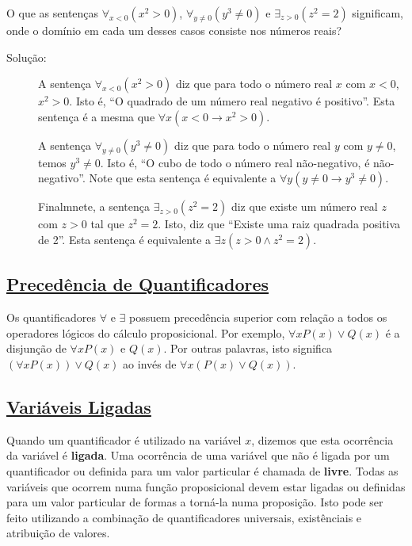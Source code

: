 \begin{exmp}
\label{exem141}
O que as sentenças $\forall_{x<0}(x^2 > 0)$, $\forall_{y \neq 0}(y^3 \neq 0)$ e
$\exists_{z>0}(z^2 = 2)$ significam, onde o domínio em cada um desses casos
consiste nos números reais?
\begin{description}
\item[Solução:] A sentença $\forall_{x<0}(x^2 > 0)$ diz que para todo o
número real $x$ com $x<0$, $x^2>0$. Isto é, ``O quadrado de um número real
negativo é positivo''. Esta sentença é a mesma que $\forall x(x<0 \to x^2>0)$.

A sentença $\forall_{y \neq 0}(y^3 \neq 0)$ diz que para todo o número real
$y$ com $y\neq0$, temos $y^3 \neq 0$. Isto é, ``O cubo de todo o número real
não-negativo, é não-negativo''. Note que esta sentença é
equivalente a $\forall y(y\neq0 \to y^3\neq0)$.

Finalmnete, a sentença $\exists_{z>0}(z^2 = 2)$ diz que existe um número real
$z$ com $z>0$ tal que $z^2=2$. Isto, diz que ``Existe uma raiz quadrada positiva
de 2''. Esta sentença é equivalente a $\exists z(z>0 \land z^2=2)$.

\end{description}
\end{exmp}

\subsection*{\underline{Precedência de Quantificadores}}

Os quantificadores $\forall$ e $\exists$ possuem precedência superior com
relação a todos os operadores lógicos do cálculo proposicional. Por exemplo,
$\forall xP(x) \lor Q(x)$ é a disjunção de $\forall xP(x)$ e $Q(x)$. Por outras
palavras, isto significa $(\forall xP(x)) \lor Q(x)$ ao invés de $\forall
x(P(x) \lor Q(x))$.


\subsection*{\underline{Variáveis Ligadas}}

Quando um quantificador é utilizado na variável $x$, dizemos que esta ocorrência
da variável é \textbf{ligada}. Uma ocorrência de uma variável que não é ligada
por um quantificador ou definida para um valor particular é chamada de
\textbf{livre}. Todas as variáveis que ocorrem numa função proposicional devem
estar ligadas ou definidas para um valor particular de formas a torná-la numa
proposição. Isto pode ser feito utilizando a combinação de quantificadores
universais, existênciais e atribuição de valores.

